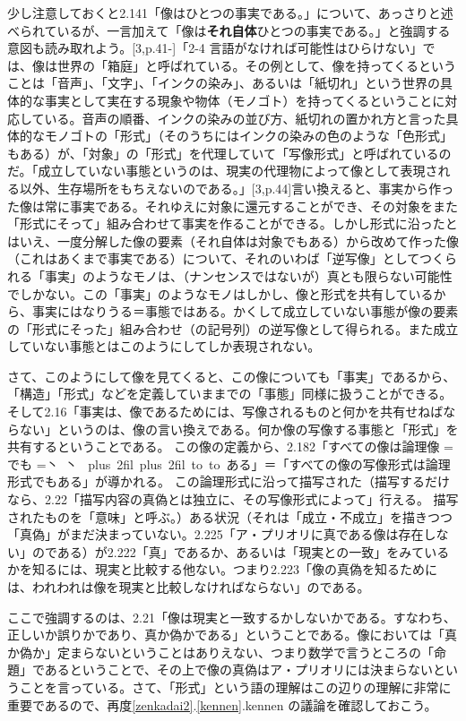 \documentclass[11pt,a4paper]{jsarticle}
\newcommand{\ruby}[2]{%
    \leavevmode
    \setbox0=\hbox{#1}%
    \setbox1=\hbox{\tiny #2}%
    \ifdim\wd0>\wd1 \dimen0=\wd0 \else \dimen0=\wd1 \fi
    \hbox{%
    \kanjiskip=0pt plus 2fil
    \xkanjiskip=0pt plus 2fil
    \vbox{%
    \hbox to \dimen0{%
    \tiny \hfil#2\hfil}%
    \nointerlineskip
    \hbox to \dimen0{\mathstrut\hfil#1\hfil}}}}
\begin{document}
少し注意しておくと2.141「像はひとつの事実である。」について、あっさりと述べられているが、一言加えて「像は{\bf それ自体}ひとつの事実である。」と強調する意図も読み取れよう。[3,p.41-]「2-4 言語がなければ可能性はひらけない」では、像は世界の「箱庭」と呼ばれている。その例として、像を持ってくるということは「音声」、「文字」、「インクの染み」、あるいは「紙切れ」という世界の具体的な事実として実在する現象や物体（モノゴト）を持ってくるということに対応している。音声の順番、インクの染みの並び方、紙切れの置かれ方と言った具体的なモノゴトの「形式」（そのうちにはインクの染みの色のような「色形式」もある）が、「対象」の「形式」を代理していて「写像形式」と呼ばれているのだ。「成立していない事態というのは、現実の代理物によって像として表現される以外、生存場所をもちえないのである。」[3,p.44]言い換えると、事実から作った像は常に事実である。それゆえに対象に還元することができ、その対象をまた「形式にそって」組み合わせて事実を作ることができる。しかし形式に沿ったとはいえ、一度分解した像の要素（それ自体は対象でもある）から改めて作った像（これはあくまで事実である）について、それのいわば「逆写像」としてつくられる「事実」のようなモノは、（ナンセンスではないが）真とも限らない可能性でしかない。この「事実」のようなモノはしかし、像と形式を共有しているから、事実にはなりうる＝事態ではある。かくして成立していない事態が像の要素の「形式にそった」組み合わせ（の記号列）の逆写像として得られる。また成立していない事態とはこのようにしてしか表現されない。

さて、このようにして像を見てくると、この像についても「事実」であるから、「構造」「形式」などを定義していままでの「事態」同様に扱うことができる。そして2.16「事実は、像であるためには、写像されるものと何かを共有せねばならない」というのは、像の言い換えである。何か像の写像する事態と「形式」を共有するということである。
この像の定義から、2.182「すべての像は論理像\ruby{でも}{丶 丶}ある」＝「すべての像の写像形式は論理形式でもある」が導かれる。
この論理形式に沿って描写された（描写するだけなら、2.22「描写内容の真偽とは独立に、その写像形式によって」行える。 描写されたものを「意味」と呼ぶ。）ある状況（それは「成立・不成立」を描きつつ「真偽」がまだ決まっていない。2.225「ア・プリオリに真である像は存在しない」のである）が2.222「真」であるか、あるいは「現実との一致」をみているかを知るには、現実と比較する他ない。つまり2.223「像の真偽を知るためには、われわれは像を現実と比較しなければならない」のである。

ここで強調するのは、2.21「像は現実と一致するかしないかである。すなわち、正しいか誤りかであり、真か偽かである」ということである。像においては「真か偽か」定まらないということはありえない、つまり数学で言うところの「命題」であるということで、その上で像の真偽はア・プリオリには決まらないということを言っている。さて、「形式」という語の理解はこの辺りの理解に非常に重要であるので、再度\ref{zenkadai2}.\ref{kennen}.kennen の議論を確認しておこう。
\end{document}
